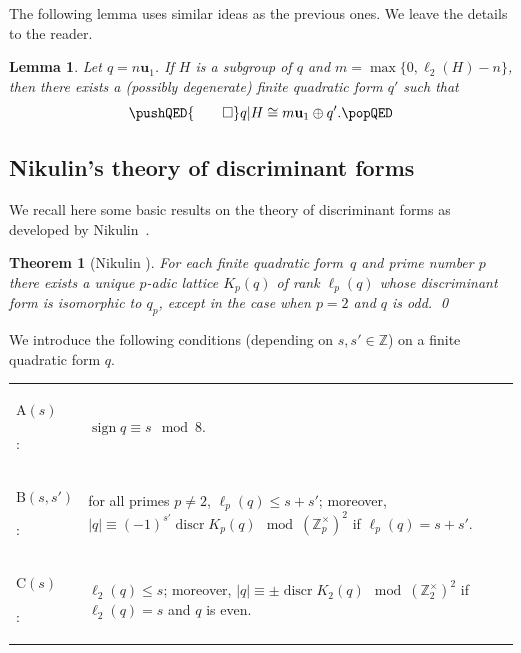 \documentclass[a4paper]{amsart}
\theoremstyle{definition}
\theoremstyle{plain}
\newtheorem{theorem}[definition]{Theorem}
\newtheorem{lemma}[definition]{Lemma}
\DeclareMathOperator{\sign}{sign}
\DeclareMathOperator{\discr}{discr}
\newcommand{\IZ}{\mathbb{Z}}
\newcommand{\bu}{\mathbf{u}}
\begin{document}
The following lemma uses similar ideas as the previous ones. We leave the details to the reader.

\begin{lemma} \label{lem:subgroups-u1^n}
Let \(q = n\bu_1\). If \(H\) is a subgroup of \(q\) and \(m = \max\{ 0, \ell_2(H) - n\}\), then there exists a (possibly degenerate) finite quadratic form \(q'\) such that 
\[
\pushQED{\qed} 
     q|H \cong m\bu_1 \oplus q'. \qedhere
\popQED
\]
\end{lemma}

\subsection{Nikulin's theory of discriminant forms} \label{subsec:nikulin}

We recall here some basic results on the theory of discriminant forms as developed by Nikulin~\cite{Nikulin:int.sym.bilinear.forms}.

\begin{theorem}[Nikulin {\cite[Theorem 1.9.1]{Nikulin:int.sym.bilinear.forms}}] 
For each finite quadratic form~\(q\) and prime number \(p\) there exists a unique \(p\)-adic lattice \(K_p(q)\) of rank \(\ell_p(q)\) whose discriminant form is isomorphic to \(q_p\), except in the case when \(p = 2\) and \(q\) is odd. \qed
\end{theorem}

\newcommand{\condA}[1]{\hyperlink{cond:A}{\mathrm A}(#1)}
\newcommand{\condB}[1]{\hyperlink{cond:B}{\mathrm B}(#1)}
\newcommand{\condC}[1]{\hyperlink{cond:C}{\mathrm C}(#1)}

We introduce the following conditions (depending on \(s,s' \in \IZ\)) on a finite quadratic form \(q\). 

\vspace{3mm}
\begin{tabular}{ll}
    \hypertarget{cond:A}{\({\mathrm A}(s)\)}: &  \(\sign q \equiv s \mod 8\). \\[3mm]
    \hypertarget{cond:B}{\({\mathrm B}(s, s')\)}: & \parbox{.79\textwidth}{for all primes \(p \neq 2\), \(\ell_p(q) \leq s + s'\); moreover, \\ \(|q| \equiv (-1)^{s'} \discr K_p(q) \mod (\IZ_p^\times)^2\) if \(\ell_p(q) = s + s'\).} \\[4mm]
    \hypertarget{cond:C}{\({\mathrm C}(s)\)}: & \parbox{.79\textwidth}{\(\ell_2(q) \leq s\); moreover, \(|q| \equiv \pm \discr K_2(q) \mod (\IZ_2^\times)^2\) \\ if \(\ell_2(q) = s\) and \(q\) is even.}
\end{tabular}
\vspace{3mm}
\end{document}
